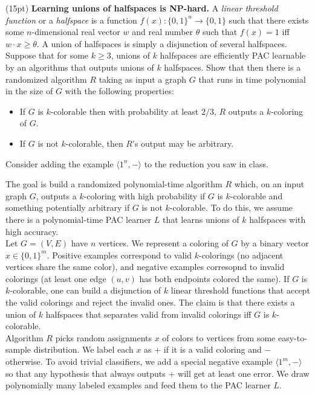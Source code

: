 \documentclass[11pt]{article}
\DeclareMathOperator{\1}{\mathbbm{1}}
\begin{document}
\begin{problem}(15pt) \textbf{Learning unions of halfspaces is NP-hard.} A {\em linear threshold function} or a {\em halfspace} is a function
$f(x): \{0,1\}^n \rightarrow \{0,1\}$ such that there exists some
$n$-dimensional real vector $w$ and real number $\theta$ such that
$f(x) = 1$ iff $w \cdot x \geq \theta.$ 
A union of halfspaces is simply a disjunction of several halfspaces. Suppose that for some $k \ge 3$, unions of $k$ halfspaces are
efficiently PAC learnable by an algorithms that outputs unions of $k$ halfspaces. 
Show that then there is a randomized algorithm $R$ taking as input a graph
$G$ that runs in
time polynomial in the size of $G$ with the
following properties:
\begin{itemize}
\item If $G$ is $k$-colorable then with probability
at least $2/3$, $R$ outputs a $k$-coloring of $G$.
\item If $G$ is not $k$-colorable, then $R$'s output may be arbitrary.
\end{itemize}

\hint Consider adding the example $\langle 1^n, - \rangle$ to the reduction you saw in class.
\end{problem}
The goal is build a randomized polynomial-time algorithm $R$ which, on an input graph $G$, outputs a $k$-coloring with high probability if $G$ is $k$-colorable and something potentially arbitrary if $G$ is not $k$-colorable. To do this, we assume there is a polynomial-time PAC learner $L$ that learns unions of $k$ halfspaces with high accuracy. \\
Let $G=(V,E)$ have $n$ vertices. We represent a coloring of $G$ by a binary vector $x \in \{0,1\}^m$. Positive examples correspond to valid $k$-colorings (no adjacent vertices share the same color), and negative examples corresopnd to invalid colorings (at least one edge $(u,v)$ has both endpoints colored the same). If $G$ is $k$-colorable, one can build a disjunction of $k$ linear threshold functions that accept the valid colorings and reject the invalid ones. The claim is that there exists a union of $k$ halfspaces that separates valid from invalid colorings iff $G$ is $k$-colorable. \\
Algorithm $R$ picks random assignments $x$ of colors to vertices from some easy-to-sample distribution. We label each $x$ as $+$ if it is a valid coloring and $-$ otherwise. To avoid trivial classifiers, we add a special negative example $\langle 1^m, - \rangle$ so that any hypothesis that always outputs $+$ will get at least one error. We draw polynomially many labeled examples and feed them to the PAC learner $L$. \\
\end{document}
